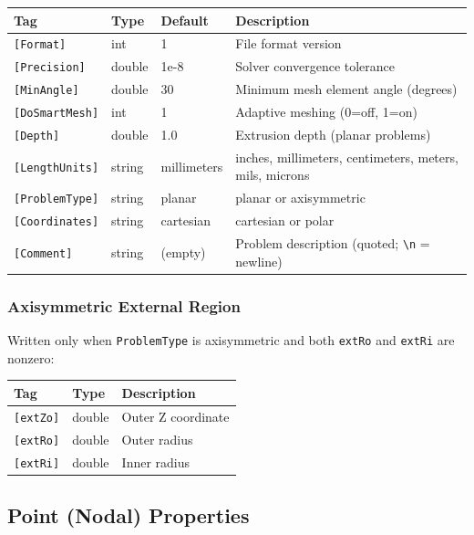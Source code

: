 \documentclass[11pt]{article}
\begin{document}
\begin{longtable}{lllp{6cm}}
\toprule
Tag & Type & Default & Description \\
\midrule
\endhead
\verb|[Format]|      & int     & 1          & File format version \\
\verb|[Precision]|   & double  & 1e-8       & Solver convergence tolerance \\
\verb|[MinAngle]|    & double  & 30         & Minimum mesh element angle (degrees) \\
\verb|[DoSmartMesh]| & int     & 1          & Adaptive meshing (0=off, 1=on) \\
\verb|[Depth]|       & double  & 1.0        & Extrusion depth (planar problems) \\
\verb|[LengthUnits]| & string  & millimeters & inches, millimeters, centimeters, meters, mils, microns \\
\verb|[ProblemType]| & string  & planar     & planar or axisymmetric \\
\verb|[Coordinates]| & string  & cartesian  & cartesian or polar \\
\verb|[Comment]|     & string  & (empty)    & Problem description (quoted; \verb|\n| = newline) \\
\bottomrule
\end{longtable}

\subsubsection{Axisymmetric External Region}

Written only when \verb|ProblemType| is axisymmetric and both
\verb|extRo| and \verb|extRi| are nonzero:

\begin{longtable}{llp{8cm}}
\toprule
Tag & Type & Description \\
\midrule
\verb|[extZo]| & double & Outer Z coordinate \\
\verb|[extRo]| & double & Outer radius \\
\verb|[extRi]| & double & Inner radius \\
\bottomrule
\end{longtable}

\subsection{Point (Nodal) Properties}
\end{document}
